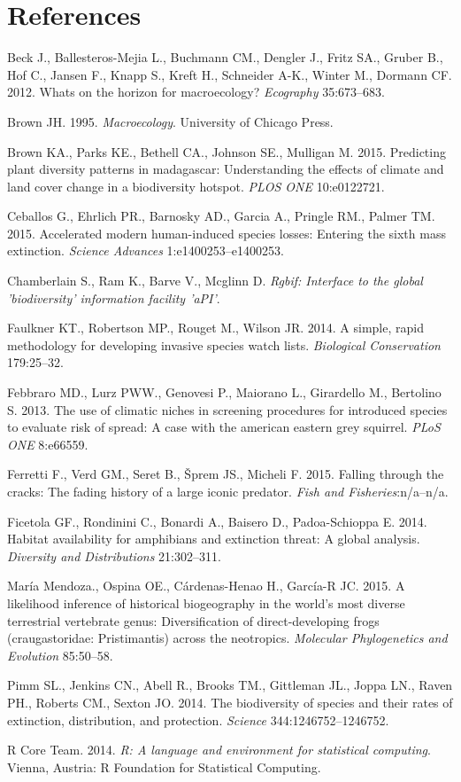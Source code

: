 \documentclass[author-year, review, 11pt]{components/elsarticle} %
\begin{document}
\section*{References}\label{references}

Beck J., Ballesteros-Mejia L., Buchmann CM., Dengler J., Fritz SA.,
Gruber B., Hof C., Jansen F., Knapp S., Kreft H., Schneider A-K., Winter
M., Dormann CF. 2012. Whats on the horizon for macroecology?
\emph{Ecography} 35:673--683.

Brown JH. 1995. \emph{Macroecology}. University of Chicago Press.

Brown KA., Parks KE., Bethell CA., Johnson SE., Mulligan M. 2015.
Predicting plant diversity patterns in madagascar: Understanding the
effects of climate and land cover change in a biodiversity hotspot.
\emph{PLOS ONE} 10:e0122721.

Ceballos G., Ehrlich PR., Barnosky AD., Garcia A., Pringle RM., Palmer
TM. 2015. Accelerated modern human-induced species losses: Entering the
sixth mass extinction. \emph{Science Advances} 1:e1400253--e1400253.

Chamberlain S., Ram K., Barve V., Mcglinn D. \emph{Rgbif: Interface to
the global 'biodiversity' information facility 'aPI'}.

Faulkner KT., Robertson MP., Rouget M., Wilson JR. 2014. A simple, rapid
methodology for developing invasive species watch lists.
\emph{Biological Conservation} 179:25--32.

Febbraro MD., Lurz PWW., Genovesi P., Maiorano L., Girardello M.,
Bertolino S. 2013. The use of climatic niches in screening procedures
for introduced species to evaluate risk of spread: A case with the
american eastern grey squirrel. \emph{PLoS ONE} 8:e66559.

Ferretti F., Verd GM., Seret B., {Š}prem JS., Micheli F. 2015. Falling
through the cracks: The fading history of a large iconic predator.
\emph{Fish and Fisheries}:n/a--n/a.

Ficetola GF., Rondinini C., Bonardi A., Baisero D., Padoa-Schioppa E.
2014. Habitat availability for amphibians and extinction threat: A
global analysis. \emph{Diversity and Distributions} 21:302--311.

Mar{í}a Mendoza., Ospina OE., C{á}rdenas-Henao H., Garc{í}a-R JC. 2015.
A likelihood inference of historical biogeography in the world's most
diverse terrestrial vertebrate genus: Diversification of
direct-developing frogs (craugastoridae: Pristimantis) across the
neotropics. \emph{Molecular Phylogenetics and Evolution} 85:50--58.

Pimm SL., Jenkins CN., Abell R., Brooks TM., Gittleman JL., Joppa LN.,
Raven PH., Roberts CM., Sexton JO. 2014. The biodiversity of species and
their rates of extinction, distribution, and protection. \emph{Science}
344:1246752--1246752.

R Core Team. 2014. \emph{R: A language and environment for statistical
computing}. Vienna, Austria: R Foundation for Statistical Computing.
\end{document}
